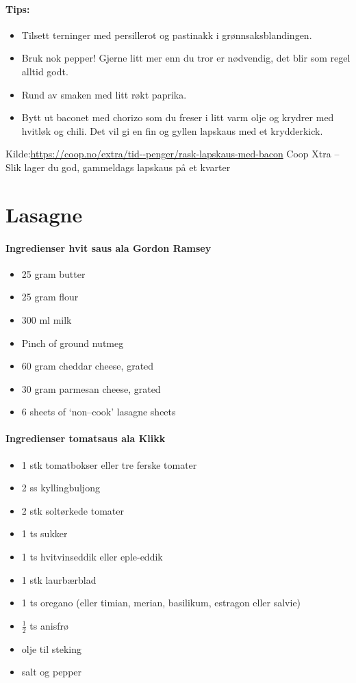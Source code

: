 \documentclass[12pt,a4paper]{book}
\begin{document}
\paragraph{Tips:}
\begin{itemize}[noitemsep]
	\item Tilsett terninger med persillerot og pastinakk i grønnsaksblandingen.
	\item Bruk nok pepper! Gjerne litt mer enn du tror er nødvendig, det blir som regel alltid godt.
	\item Rund av smaken med litt røkt paprika.
	\item   Bytt ut baconet med chorizo som du freser i litt varm olje og krydrer med hvitløk og chili. Det vil gi en fin og gyllen lapskaus med et krydderkick.
\end{itemize}

Kilde:\url{https://coop.no/extra/tid--penger/rask-lapskaus-med-bacon} Coop Xtra -- Slik lager du god, gammeldags lapskaus på et kvarter
\clearpage{}
\clearpage{}\section{﻿Lasagne}


\paragraph{Ingredienser hvit saus ala Gordon Ramsey}
\begin{itemize}[noitemsep]
	\item 25 gram butter
	\item 25 gram flour
	\item 300 ml milk
	\item Pinch of ground nutmeg
	\item 60 gram cheddar cheese, grated
	\item 30 gram parmesan cheese, grated
	\item 6 sheets of `non--cook' lasagne sheets
\end{itemize}

\paragraph{Ingredienser tomatsaus ala Klikk}
\begin{itemize}[noitemsep]
	\item 1 stk tomatbokser eller tre ferske tomater
	\item 2 ss kyllingbuljong
	\item 2 stk soltørkede tomater
	\item 1 ts sukker
	\item 1 ts hvitvinseddik eller eple-eddik
	\item 1 stk laurbærblad
	\item 1 ts oregano (eller timian, merian, basilikum, estragon eller salvie)
	\item  $\frac{1}{2}$  ts anisfrø
	\item olje til steking
	\item salt og pepper
\end{itemize}
\end{document}
